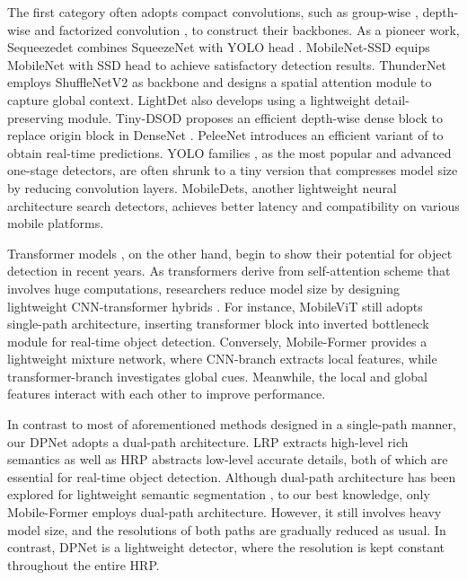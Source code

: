 \documentclass[lettersize,journal]{IEEEtran}
\begin{document}
The first category often adopts compact convolutions, such as group-wise \cite{sandler2018mobilenetv2}, depth-wise \cite{howard2017mobilenets} and factorized convolution \cite{li2021micronet}, to construct their backbones. As a pioneer work, Sequeezedet\cite{squeezedet} combines SqueezeNet \cite{iandola2016squeezenet} with YOLO head \cite{redmon2016you}. MobileNet-SSD \cite{sandler2018mobilenetv2} equips MobileNet \cite{howard2017mobilenets} with SSD head \cite{liu2016ssd} to achieve satisfactory detection results. ThunderNet \cite{qin2019thundernet} employs ShuffleNetV2 \cite{ma2018shufflenet} as backbone and designs a spatial attention module to capture global context. LightDet \cite{tang2020lightdet} also develops \cite{ma2018shufflenet} using a lightweight detail-preserving module. Tiny-DSOD \cite{li2018tiny} proposes an efficient depth-wise dense block to replace origin block in DenseNet \cite{huang2017densely}. PeleeNet \cite{Pelee} introduces an efficient variant of \cite{huang2017densely} to obtain real-time predictions. YOLO families \cite{redmon2017yolo9000,redmon2018yolov3}, as the most popular and advanced one-stage detectors, are often shrunk to a tiny version \cite{wang2021scaled} that compresses model size by reducing convolution layers. MobileDets\cite{xiong2021mobiledets}, another lightweight neural architecture search detectors, achieves better latency and compatibility on various mobile platforms. 

Transformer models \cite{liu2021Swin,chen2021mobile,mehta2021mobilevit}, on the other hand, begin to show their potential for object detection in recent years. As transformers derive from self-attention scheme \cite{vaswani2017attention} that involves huge computations, researchers reduce model size by designing lightweight CNN-transformer hybrids \cite{mehta2021mobilevit,chen2021mobile}. For instance, MobileViT \cite{mehta2021mobilevit} still adopts single-path architecture, inserting transformer block into inverted bottleneck module \cite{sandler2018mobilenetv2} for real-time object detection. Conversely, Mobile-Former\cite{chen2021mobile}  provides a lightweight mixture network, where CNN-branch extracts local features, while transformer-branch investigates global cues. Meanwhile, the local and global features interact with each other to improve performance.

In contrast to most of aforementioned methods designed in a single-path manner, our DPNet adopts a dual-path architecture. LRP extracts high-level rich semantics as well as HRP abstracts low-level accurate details, both of which are essential for real-time object detection. Although dual-path architecture has been explored for lightweight semantic segmentation \cite{yu2018bisenet,yu2021bisenet}, to our best knowledge, only Mobile-Former \cite{chen2021mobile} employs dual-path architecture. However, it still involves heavy model size, and the resolutions of both paths are gradually reduced as usual. In contrast, DPNet is a lightweight detector, where the resolution is kept constant throughout the entire HRP.
\end{document}
